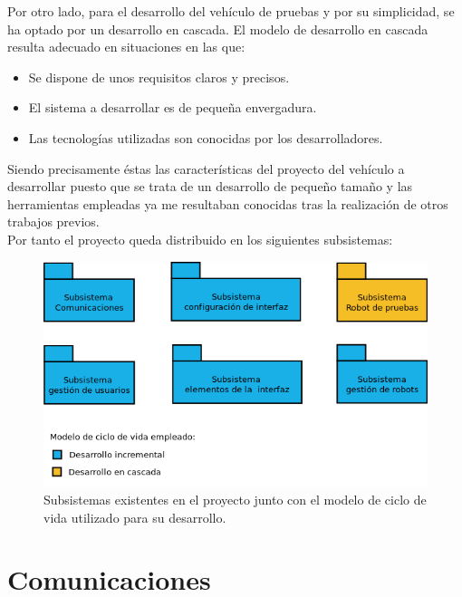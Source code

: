 \documentclass[a4paper,12pt]{article}
\begin{document}
Por otro lado, para el desarrollo del vehículo de pruebas y por su simplicidad, se ha optado por un desarrollo en cascada. El modelo de desarrollo en cascada resulta adecuado en situaciones
en las que:\\

\begin{itemize}
 \item Se dispone de unos requisitos claros y precisos.
 \item El sistema a desarrollar es de pequeña envergadura.
 \item Las tecnologías utilizadas son conocidas por los desarrolladores.
\end{itemize}

Siendo precisamente éstas las características del proyecto del vehículo a desarrollar puesto que se trata de un desarrollo de pequeño tamaño y las herramientas empleadas ya me resultaban conocidas
tras la realización de otros trabajos previos.\\

Por tanto el proyecto queda distribuido en los siguientes subsistemas:\\

\begin{figure}[H]
  \begin{center}
    \includegraphics[scale=.6]{imagenes/subsistemas.png}
  \end{center}
  \caption{Subsistemas existentes en el proyecto junto con el modelo de ciclo de vida
utilizado para su desarrollo.}
  \label{website:pagina-principal}
\end{figure}



\section{ Comunicaciones }
\end{document}
